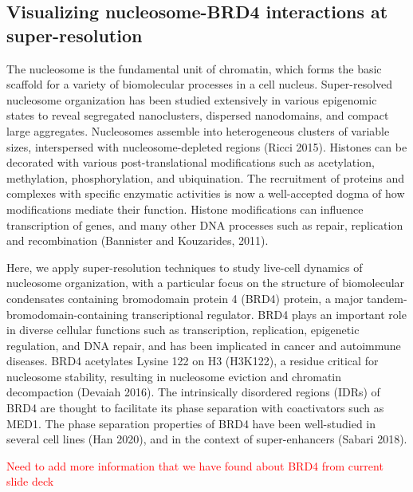 \documentclass{ucetd}
\begin{document}
\subsection{Visualizing nucleosome-BRD4 interactions at super-resolution}

The nucleosome is the fundamental unit of chromatin, which forms the basic scaffold for a variety of biomolecular processes in a cell nucleus. Super-resolved nucleosome organization has been studied extensively in various epigenomic states to reveal segregated nanoclusters, dispersed nanodomains, and compact large aggregates. Nucleosomes assemble into heterogeneous clusters of variable sizes, interspersed with nucleosome-depleted regions (Ricci 2015). Histones can be decorated with various post-translational modifications such as acetylation, methylation, phosphorylation, and ubiquination. The recruitment of proteins and complexes with specific enzymatic activities is now a well-accepted dogma of how modifications mediate their function. Histone modifications can influence transcription of genes, and many other DNA processes such as repair, replication and recombination (Bannister and Kouzarides, 2011). 

Here, we apply super-resolution techniques to study live-cell dynamics of nucleosome organization, with a particular focus on the structure of biomolecular condensates containing bromodomain protein 4 (BRD4) protein, a major tandem-bromodomain-containing transcriptional regulator. BRD4 plays an important role in diverse cellular functions such as transcription, replication, epigenetic regulation, and DNA repair, and has been implicated in cancer and autoimmune diseases. BRD4 acetylates Lysine 122 on H3 (H3K122), a residue critical for nucleosome stability, resulting in nucleosome eviction and chromatin decompaction (Devaiah 2016). The intrinsically disordered regions (IDRs) of BRD4 are thought to facilitate its phase separation with coactivators such as MED1. The phase separation properties of BRD4 have been well-studied in several cell lines (Han 2020), and in the context of super-enhancers (Sabari 2018).

\textcolor{red}{Need to add more information that we have found about BRD4 from current slide deck}
\end{document}
